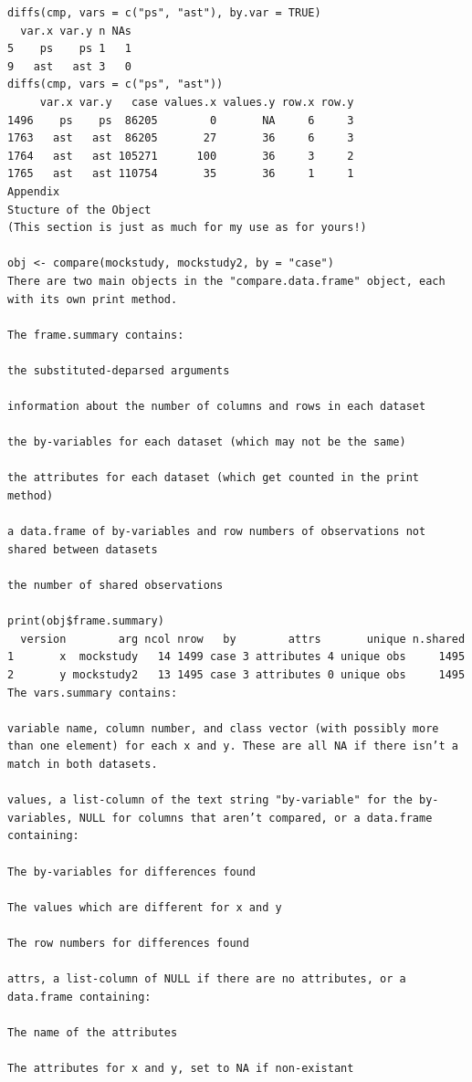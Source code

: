 \documentclass[
]{book}
\begin{document}
\begin{verbatim}
diffs(cmp, vars = c("ps", "ast"), by.var = TRUE)
  var.x var.y n NAs
5    ps    ps 1   1
9   ast   ast 3   0
diffs(cmp, vars = c("ps", "ast"))
     var.x var.y   case values.x values.y row.x row.y
1496    ps    ps  86205        0       NA     6     3
1763   ast   ast  86205       27       36     6     3
1764   ast   ast 105271      100       36     3     2
1765   ast   ast 110754       35       36     1     1
Appendix
Stucture of the Object
(This section is just as much for my use as for yours!)

obj <- compare(mockstudy, mockstudy2, by = "case")
There are two main objects in the "compare.data.frame" object, each with its own print method.

The frame.summary contains:

the substituted-deparsed arguments

information about the number of columns and rows in each dataset

the by-variables for each dataset (which may not be the same)

the attributes for each dataset (which get counted in the print method)

a data.frame of by-variables and row numbers of observations not shared between datasets

the number of shared observations

print(obj$frame.summary)
  version        arg ncol nrow   by        attrs       unique n.shared
1       x  mockstudy   14 1499 case 3 attributes 4 unique obs     1495
2       y mockstudy2   13 1495 case 3 attributes 0 unique obs     1495
The vars.summary contains:

variable name, column number, and class vector (with possibly more than one element) for each x and y. These are all NA if there isn’t a match in both datasets.

values, a list-column of the text string "by-variable" for the by-variables, NULL for columns that aren’t compared, or a data.frame containing:

The by-variables for differences found

The values which are different for x and y

The row numbers for differences found

attrs, a list-column of NULL if there are no attributes, or a data.frame containing:

The name of the attributes

The attributes for x and y, set to NA if non-existant


\end{verbatim}
\end{document}
